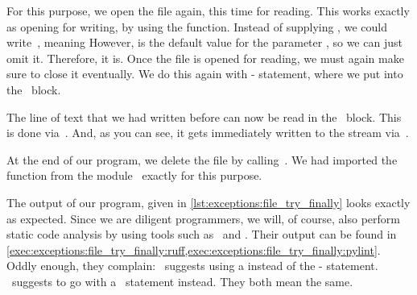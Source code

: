 For this purpose, we open the file again, this time for reading.
This works exactly as opening for writing, by using the  function.
Instead of supplying , we could write~, meaning 
However,  is the default value for the parameter , so we can just omit it.
Therefore,  it is.
Once the file is opened for reading, we must again make sure to close it eventually.
We do this again with - statement, where we put  into the ~block.

The line of text that we had written before can now be read in the ~block.
This is done via~.
And, as you can see, it gets immediately written to the  stream via~.

At the end of our program, we delete the file  by calling~.
We had imported the  function from the module~ exactly for this purpose.

The output of our program, given in \cref{lst:exceptions:file_try_finally} looks exactly as expected.
Since we are diligent programmers, we will, of course, also perform static code analysis by using tools such as \ruff\ and \pylint.
Their output can be found in \cref{exec:exceptions:file_try_finally:ruff,exec:exceptions:file_try_finally:pylint}.
Oddly enough, they complain:
\ruff\ suggests using a  instead of the - statement.
\pylint\ suggests to go with a ~statement instead.
They both mean the same.

